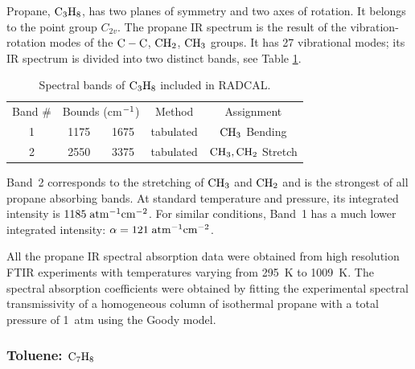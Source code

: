 Propane, $\rm C_3H_8$, has two planes of symmetry and two axes of rotation. It belongs to the point group $C_{2v}$. The propane IR spectrum is the result of the vibration-rotation modes of the $\rm C-C$, $\rm CH_2$, $\rm CH_3$ groups. It has 27 vibrational modes; its IR spectrum is divided into two distinct bands, see Table \ref{Table::C3H8}.
\begin{table}[ht]
   \centering
   \caption{Spectral bands of $\rm C_3H_8$ included in RADCAL.}
   \vspace{0.1in}
   \label{Table::C3H8}
   \begin{tabular}{|c|c|c|c|c|}
    \hline
    Band \# & \multicolumn{2}{|l|}{Bounds (cm$\rm ^{-1}$) } & Method & Assignment \\
    \cline{1-5}
    1 & 1175 & 1675 & tabulated &  $\rm CH_3$ Bending\\
    2 & 2550 & 3375 & tabulated &  $\rm CH_3, CH_2$ Stretch\\
    \hline
   \end{tabular}
\end{table}
Band~2 corresponds to the stretching of $\rm CH_3$ and $\rm CH_2$ and is the strongest of all propane absorbing bands. At standard temperature and pressure, its integrated intensity is $1185\;\rm {atm^{-1}cm^{-2}}$. For similar conditions, Band~1 has a much lower integrated intensity: $\alpha = 121\;\rm {atm^{-1}cm^{-2}}$.

All the propane IR spectral absorption data were obtained from high resolution FTIR experiments with temperatures varying from 295~K to 1009~K. The spectral absorption coefficients were obtained by fitting the experimental spectral transmissivity of a homogeneous column of isothermal propane with a total pressure of 1~atm using the Goody model.

\subsubsection{Toluene: $\rm C_7H_8$}

